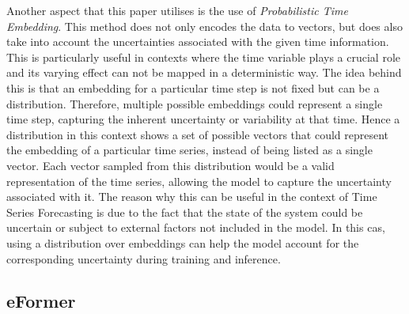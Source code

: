 \documentclass{article}
\begin{document}
Another aspect that this paper utilises is the use of \textit{Probabilistic Time Embedding}. This method does not only encodes the data to vectors, but does also take into account the uncertainties associated with the given time information. This is particularly useful in contexts where the time variable plays a crucial role and its varying effect can not be mapped in a deterministic way. The idea behind this is that an embedding for a particular time step is not fixed but can be a distribution. Therefore, multiple possible embeddings could represent a single time step, capturing the inherent uncertainty or variability at that time. Hence a distribution in this context shows a set of possible vectors that could represent the embedding of a particular time series, instead of being listed as a single vector. Each vector sampled from this distribution would be a valid representation of the time series, allowing the model to capture the uncertainty associated with it. The reason why this can be useful in the context of Time Series Forecasting is due to the fact that the state of the system could be uncertain or subject to external factors not included in the model. In this cas, using a distribution over embeddings can help the model account for the corresponding uncertainty during training and inference.

\subsection{eFormer}
\end{document}
